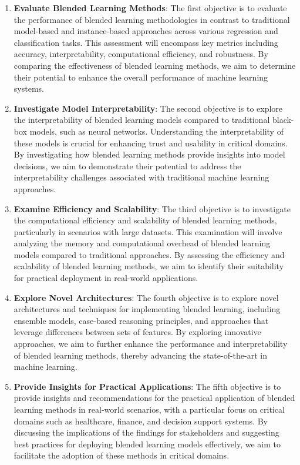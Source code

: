 \documentclass[a4paper, 12pt]{report}
\begin{document}
\begin{enumerate}
    \item \textbf{Evaluate Blended Learning Methods}: 
    The first objective is to evaluate the performance of blended learning methodologies in contrast to traditional 
    model-based and instance-based approaches across various regression and classification tasks. 
    This assessment will encompass key metrics including accuracy, interpretability, computational efficiency, and robustness. 
    By comparing the effectiveness of blended learning methods, we aim to determine their potential to enhance the overall performance of machine learning systems.
    
    \item \textbf{Investigate Model Interpretability}: 
    The second objective is to explore the interpretability of blended learning models compared to traditional black-box models, such as neural networks. 
    Understanding the interpretability of these models is crucial for enhancing trust and usability in critical domains. 
    By investigating how blended learning methods provide insights into model decisions, we aim to demonstrate their potential to address the interpretability 
    challenges associated with traditional machine learning approaches.
    
    \item \textbf{Examine Efficiency and Scalability}: 
    The third objective is to investigate the computational efficiency and scalability of blended learning methods, particularly in scenarios with large datasets. 
    This examination will involve analyzing the memory and computational overhead of blended learning models compared to traditional approaches. 
    By assessing the efficiency and scalability of blended learning methods, we aim to identify their suitability for practical deployment in real-world applications.
    
    \item \textbf{Explore Novel Architectures}: 
    The fourth objective is to explore novel architectures and techniques for implementing blended learning, 
    including ensemble models, case-based reasoning principles, and approaches that leverage differences between sets of features. 
    By exploring innovative approaches, we aim to further enhance the performance and interpretability of blended learning methods, 
    thereby advancing the state-of-the-art in machine learning.
    
    \item \textbf{Provide Insights for Practical Applications}: 
    The fifth objective is to provide insights and recommendations for the practical application of blended learning methods in real-world scenarios, with a particular focus on critical domains such as healthcare, 
    finance, and decision support systems. By discussing the implications of the findings for stakeholders and suggesting best practices for deploying blended learning models effectively, 
    we aim to facilitate the adoption of these methods in critical domains.


\end{enumerate}
\end{document}
